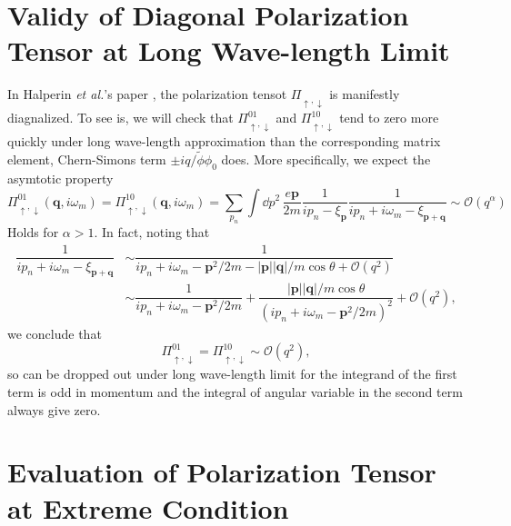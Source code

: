 \documentclass[bachelor,english,numbers]{ustcthesis}
\begin{document}
\chapter{Validy of Diagonal Polarization Tensor at Long Wave-length Limit}
	In Halperin {\it et al.}'s paper \cite{Halperin1995Theory}, the polarization tensot $\Pi_{\uparrow,\downarrow}$ is manifestly diagnalized. To see is, we will check that $\Pi^{01}_{\uparrow,\downarrow}$ and $\Pi^{10}_{\uparrow,\downarrow}$ tend to zero more quickly under long wave-length approximation than the corresponding matrix element, Chern-Simons term $\pm iq/\widetilde{\phi}\phi_0$ does. More specifically, we expect the asymtotic property
	\begin{equation}\label{0.2.1}
		\Pi^{01}_{\uparrow,\downarrow}(\bm{q},i\omega_m)=\Pi^{10}_{\uparrow,\downarrow}(\bm{q},i\omega_m)=\sum_{p_n}\int\dd p^2\,\dfrac{e\bm{p}}{2m}\dfrac{1}{ip_n-\xi_{\bm{p}}}\dfrac{1}{ip_n+i\omega_m-\xi_{\bm{p+q}}}\sim\mathcal{O}(q^\alpha)
	\end{equation}
	Holds for $\alpha>1$. In fact, noting that 
	\begin{align*}
		\dfrac{1}{ip_n+i\omega_m-\xi_{\bm{p+q}}}&\sim\dfrac{1}{ip_n+i\omega_m-\bm{p}^2/2m-|\bm{p}||\bm{q}|/m\cos\theta+\mathcal{O}(q^2)}\\
		&\sim\dfrac{1}{ip_n+i\omega_m-\bm{p}^2/2m}+\dfrac{|\bm{p}||\bm{q}|/m\cos\theta}{(ip_n+i\omega_m-\bm{p}^2/2m)^2}+\mathcal{O}(q^2),
	\end{align*}
	we conclude that
	\begin{equation*}
		\Pi^{01}_{\uparrow,\downarrow}=\Pi^{10}_{\uparrow,\downarrow}\sim\mathcal{O}(q^2),
	\end{equation*}
	so can be dropped out under long wave-length limit for the integrand of the first term is odd in momentum and the integral of angular variable in the second term always give zero.
\chapter{Evaluation of Polarization Tensor at Extreme Condition}

%
\end{document}
